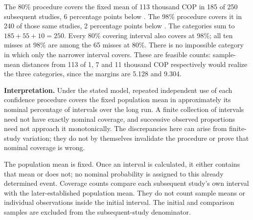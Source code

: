 


The 80\% procedure covers the fixed mean of 113 thousand COP in 185 of 250 subsequent studies, 6 percentage points below . The 98\% procedure covers it in 240 of those same studies, 2 percentage points below . The categories sum to $185+55+10=250$. Every 80\% covering interval also covers at 98\%; all ten misses at 98\% are among the 65 misses at 80\%. There is no impossible category in which only the narrower interval covers. These are feasible counts: sample-mean distances from 113 of 1, 7 and 11 thousand COP respectively would realize the three categories, since the margins are 5.128 and 9.304.

\textbf{Interpretation.} Under the stated model, repeated independent use of each confidence procedure covers the fixed population mean in approximately its nominal percentage of intervals over the long run. A finite collection of intervals need not have exactly nominal coverage, and successive observed proportions need not approach it monotonically. The discrepancies here can arise from finite-study variation; they do not by themselves invalidate the procedure or prove that nominal coverage is wrong.

The population mean is fixed. Once an interval is calculated, it either contains that mean or does not; no nominal probability is assigned to this already determined event. Coverage counts compare each subsequent study's own interval with the later-established population mean. They do not count sample means or individual observations inside the initial interval. The initial and comparison samples are excluded from the subsequent-study denominator.

